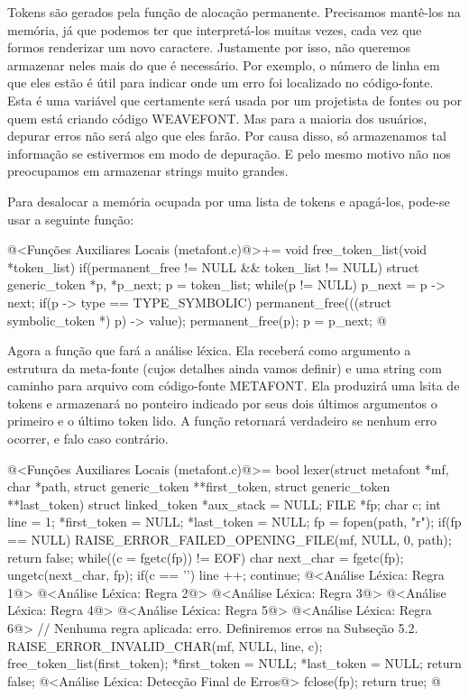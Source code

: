 Tokens são gerados pela função de alocação permanente. Precisamos
mantê-los na memória, já que podemos ter que interpretá-los muitas
vezes, cada vez que formos renderizar um novo caractere. Justamente
por isso, não queremos armazenar neles mais do que é necessário. Por
exemplo, o número de linha em que eles estão é útil para indicar onde
um erro foi localizado no código-fonte. Esta é uma variável que
certamente será usada por um projetista de fontes ou por quem está
criando código WEAVEFONT. Mas para a maioria dos usuários, depurar
erros não será algo que eles farão. Por causa disso, só armazenamos
tal informação se estivermos em modo de depuração. E pelo mesmo motivo
não nos preocupamos em armazenar strings muito grandes.

Para desalocar a memória ocupada por uma lista de tokens e apagá-los,
pode-se usar a seguinte função:

\iniciocodigo
@<Funções Auxiliares Locais (metafont.c)@>+=
void free_token_list(void *token_list){
  if(permanent_free != NULL && token_list != NULL){
    struct generic_token *p, *p_next;
    p = token_list;
    while(p != NULL){
      p_next = p -> next;
      if(p -> type == TYPE_SYMBOLIC)
        permanent_free(((struct symbolic_token *) p) -> value);
      permanent_free(p);
      p = p_next;
    }
  }
}
@
\fimcodigo


Agora a função que fará a análise léxica. Ela receberá como argumento
a estrutura da meta-fonte (cujos detalhes ainda vamos definir) e uma
string com caminho para arquivo com código-fonte METAFONT. Ela
produzirá uma lsita de tokens e armazenará no ponteiro indicado por
seus dois últimos argumentos o primeiro e o último token lido. A
função retornará verdadeiro se nenhum erro ocorrer, e falo caso
contrário.

\iniciocodigo
@<Funções Auxiliares Locais (metafont.c)@>=
bool lexer(struct metafont *mf, char *path, struct generic_token **first_token,
           struct generic_token **last_token){
  struct linked_token *aux_stack = NULL;
  FILE *fp;
  char c;
  int line = 1;
  *first_token = NULL;
  *last_token = NULL;
  fp = fopen(path, "r");
  if(fp == NULL){
    RAISE_ERROR_FAILED_OPENING_FILE(mf, NULL, 0, path);
    return false;
  }
  while((c = fgetc(fp)) != EOF){
    char next_char = fgetc(fp);
    ungetc(next_char, fp);
    if(c == '\n'){
      line ++;
      continue;
    }
    @<Análise Léxica: Regra 1@>
    @<Análise Léxica: Regra 2@>
    @<Análise Léxica: Regra 3@>
    @<Análise Léxica: Regra 4@>
    @<Análise Léxica: Regra 5@>
    @<Análise Léxica: Regra 6@>
    // Nenhuma regra aplicada: erro. Definiremos erros na Subseção 5.2.
    RAISE_ERROR_INVALID_CHAR(mf, NULL, line, c);
    free_token_list(first_token);
    *first_token = NULL;
    *last_token = NULL;
    return false;
  }
  @<Análise Léxica: Detecção Final de Erros@>
  fclose(fp);
  return true;
}
@
\fimcodigo 

